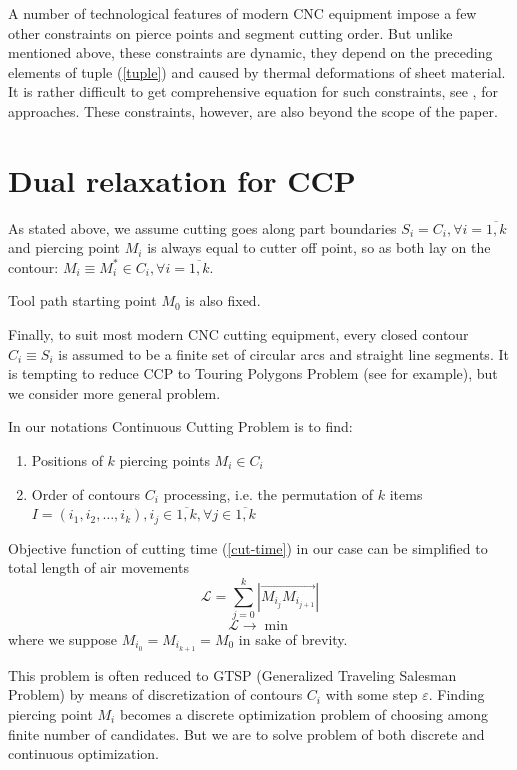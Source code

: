 \documentclass{ifacconf}
\begin{document}
A number of technological features of modern CNC equipment
impose a few other constraints on
pierce points and segment cutting order.
But unlike mentioned above,
these constraints are dynamic,
they depend on the preceding elements
of tuple (\ref{tuple})
and caused by
thermal deformations of sheet material.
It is rather difficult to get comprehensive
equation for such constraints,
see \cite{chentsov2013dynamic}, \cite{chentsov2015model} for approaches.
These constraints, however,
are also beyond the scope of the paper.

\section{Dual relaxation for CCP}
As stated above,
we assume cutting goes along part boundaries
$S_i = C_i, \forall i=\overline{1, k}$
and piercing point $M_i$ is always equal to
cutter off point,
so as both lay on the contour:
$M_i \equiv M_i^* \in C_i, \forall i = \overline{1, k}$.

Tool path starting point $M_0$ is also fixed.

Finally,
to suit most modern CNC cutting equipment,
every closed contour $C_i \equiv S_i$
is assumed to be
a finite set of circular arcs
and straight line segments.
It is tempting to reduce
CCP to
Touring Polygons Problem
(see \cite{Qin2017Nov} for example),
but we consider more general problem.

In our notations Continuous Cutting Problem is to find:
\begin{enumerate}
  \item Positions of $k$ piercing points $M_i \in C_i$
  \item Order of contours $C_i$ processing,
  i.e. the permutation of $k$ items
  $I=(i_1, i_2, \dots, i_k),
    i_j \in \overline{1,k}, \forall j \in \overline{1,k}$
\end{enumerate}
Objective function of cutting time (\ref{cut-time})
in our case can be simplified to total length of air movements
$$
\mathcal L = \sum_{j=0}^k |\overrightarrow{M_{i_j} M_{i_{{j+1}}}}|
$$
$$
\mathcal L \to \min
$$
where we suppose
$M_{i_0} = M_{i_{k+1}} = M_0$
in sake of brevity.

This problem is often
reduced to GTSP
(Generalized Traveling Salesman Problem)
by means of
discretization of contours $C_i$
with some step $\varepsilon$.
Finding piercing point $M_i$
becomes a discrete optimization problem
of choosing among finite number of
candidates.
But we are to solve
problem of both discrete and
continuous optimization.
\end{document}
